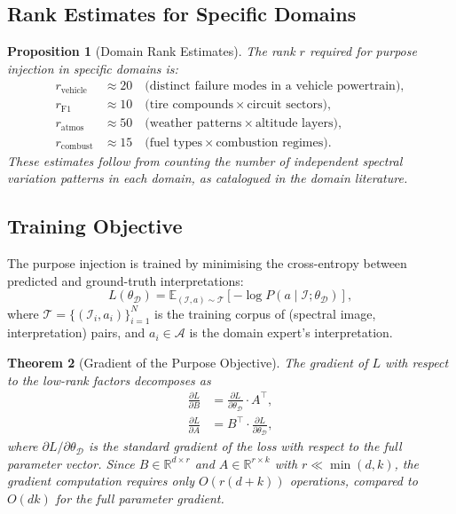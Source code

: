 \documentclass[11pt,twocolumn,a4paper]{article}
\newtheorem{theorem}{Theorem}[section]
\newtheorem{proposition}[theorem]{Proposition}
\theoremstyle{definition}
\theoremstyle{remark}
\newcommand{\R}{\mathbb{R}}
\begin{document}
\subsection{Rank Estimates for Specific Domains}

\begin{proposition}[Domain Rank Estimates]\label{prop:rank-estimates}
The rank $r$ required for purpose injection in specific domains is:
\begin{align}
    r_{\mathrm{vehicle}} &\approx 20 \quad \text{(distinct failure modes in a vehicle powertrain)}, \label{eq:rank-vehicle}\\
    r_{\mathrm{F1}} &\approx 10 \quad \text{(tire compounds} \times \text{circuit sectors)}, \label{eq:rank-f1}\\
    r_{\mathrm{atmos}} &\approx 50 \quad \text{(weather patterns} \times \text{altitude layers)}, \label{eq:rank-atmos}\\
    r_{\mathrm{combust}} &\approx 15 \quad \text{(fuel types} \times \text{combustion regimes)}. \label{eq:rank-combust}
\end{align}
These estimates follow from counting the number of independent spectral variation patterns in each domain, as catalogued in the domain literature.
\end{proposition}

\subsection{Training Objective}

The purpose injection is trained by minimising the cross-entropy between predicted and ground-truth interpretations:
\begin{equation}\label{eq:training-objective}
    L(\theta_{\mathcal{D}}) = \mathbb{E}_{(\mathcal{I}, a) \sim \mathcal{T}}\left[-\log P(a \mid \mathcal{I}; \theta_{\mathcal{D}})\right],
\end{equation}
where $\mathcal{T} = \{(\mathcal{I}_i, a_i)\}_{i=1}^N$ is the training corpus of (spectral image, interpretation) pairs, and $a_i \in \mathcal{A}$ is the domain expert's interpretation.

\begin{theorem}[Gradient of the Purpose Objective]\label{thm:gradient}
The gradient of $L$ with respect to the low-rank factors decomposes as
\begin{align}
    \frac{\partial L}{\partial B} &= \frac{\partial L}{\partial \theta_{\mathcal{D}}} \cdot A^\top, \label{eq:grad-B}\\
    \frac{\partial L}{\partial A} &= B^\top \cdot \frac{\partial L}{\partial \theta_{\mathcal{D}}}, \label{eq:grad-A}
\end{align}
where $\partial L / \partial \theta_{\mathcal{D}}$ is the standard gradient of the loss with respect to the full parameter vector.  Since $B \in \R^{d \times r}$ and $A \in \R^{r \times k}$ with $r \ll \min(d, k)$, the gradient computation requires only $O(r(d + k))$ operations, compared to $O(dk)$ for the full parameter gradient.
\end{theorem}
\end{document}
